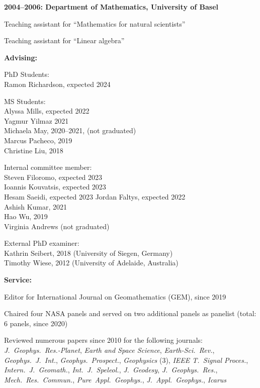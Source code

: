 \documentclass[10pt]{article}
\begin{document}
\spcp
\textbf{2004--2006: Department of Mathematics, University of Basel}

Teaching assistant for ``Mathematics for natural scientists''

Teaching assistant for ``Linear algebra''


\spc
\textbf{\tsize Advising:}

\spcp
PhD Students:\\
Ramon Richardson, expected 2024 

\spcp
MS Students:\\
Alyssa Mills, expected 2022 \\
Yagmur Yilmaz 2021 \\
Michaela May, 2020--2021, (not graduated) \\
Marcus Pacheco, 2019 \\
Christine Liu, 2018 

\spcp
Internal committee member:\\
Steven Filoromo, expected 2023\\
Ioannis Kouvatsis, expected 2023\\
Hesam Saeidi, expected 2023
Jordan Faltys, expected 2022 \\
Ashish Kumar, 2021\\
Hao Wu, 2019\\
Virginia Andrews (not graduated)

\spcp
External PhD examiner:\\
Kathrin Seibert, 2018 (University of Siegen, Germany)\\
Timothy Wiese, 2012 (University of Adelaide, Australia)




\spc
\textbf{\tsize Service:}

\spcp
Editor for International Journal on Geomathematics (GEM), since 2019

\spcp
Chaired four NASA panels and served on two
additional panels as panelist (total: 6 panels, since 2020)

\spcp
Reviewed numerous papers since 2010 for the following journals:\\
\emph{J.~Geophys.~Res.-Planet},
\emph{Earth and Space Science},
\emph{Earth-Sci.~Rev.},
\emph{Geophys.~J.~Int.},
\emph{Geophys.~Prospect.},
\emph{Geophysics} (3),
\emph{IEEE T.~Signal Proces.},
\emph{Intern.~J.~Geomath.},
\emph{Int.~J.~Speleol.},
\emph{J.~Geodesy},
\emph{J.~Geophys.~Res.},
\emph{Mech.~Res.~Commun.},
\emph{Pure~Appl.~Geophys.},
\emph{J.~Appl.~Geophys.},
\emph{Icarus}
\end{document}

